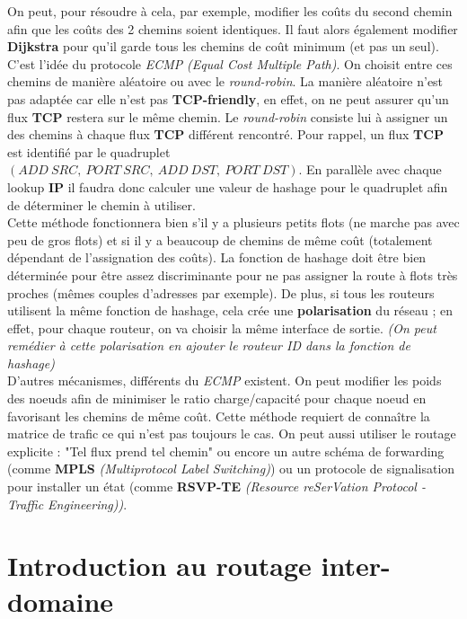 \documentclass{article}
\newcommand{\term}[1]{\textit{\textcolor{maintitle}{#1}}}
\begin{document}
\begin{sffamily}
On peut, pour résoudre à cela, par exemple, modifier les coûts du second chemin afin que les coûts des 2 chemins soient 
identiques. Il faut alors également modifier \textbf{Dijkstra} pour qu'il garde tous les chemins de coût minimum (et pas un 
seul). C'est l'idée du protocole \term{ECMP} \textit{(Equal Cost Multiple Path)}. On choisit entre ces chemins de manière 
aléatoire ou avec le \term{round-robin}. La manière aléatoire n'est pas adaptée car elle n'est pas \textbf{TCP-friendly}, en 
effet, on ne peut assurer qu'un flux \textbf{TCP} restera sur le même chemin. Le \term{round-robin} consiste lui à assigner un 
des chemins à chaque flux \textbf{TCP} différent rencontré. Pour rappel, un flux \textbf{TCP} est identifié par le quadruplet 
$(ADD\ SRC,\ PORT\ SRC,\ ADD\ DST,\ PORT\ DST)$. En parallèle avec chaque lookup \textbf{IP} il faudra donc calculer une valeur 
de hashage pour le quadruplet afin de déterminer le chemin à utiliser.\\

Cette méthode fonctionnera bien s'il y a plusieurs petits flots (ne marche pas avec peu de gros flots) et si il y a beaucoup de 
chemins de même coût (totalement dépendant de l'assignation des coûts). La fonction de hashage doit être bien déterminée pour 
être assez discriminante pour ne pas assigner la route à flots très proches (mêmes couples d'adresses par exemple). De plus, si 
tous les routeurs utilisent la même fonction de hashage, cela crée une \textbf{polarisation} du réseau ; en effet, pour chaque 
routeur, on va choisir la même interface de sortie. \textit{(On peut remédier à cette polarisation en ajouter le routeur ID dans 
la fonction de hashage)} \\

D'autres mécanismes, différents du \term{ECMP} existent. On peut modifier les poids des noeuds afin de minimiser le ratio 
charge/capacité pour chaque noeud en favorisant les chemins de même coût. Cette méthode requiert de connaître la matrice de 
trafic ce qui n'est pas toujours le cas. On peut aussi utiliser le routage explicite : "Tel flux prend tel chemin" ou encore 
un autre schéma de forwarding (comme \textbf{MPLS} \textit{(Multiprotocol Label Switching)}) ou un protocole de signalisation 
pour installer un état (comme \textbf{RSVP-TE} \textit{(Resource reSerVation Protocol -Traffic Engineering))}.

\section{Introduction au routage inter-domaine}


\end{sffamily}
\end{document}
